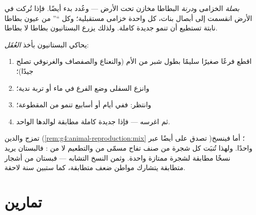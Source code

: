\begin{example}\label{ex:g4:plants-without-seeds:bulbtuber}
\emph{بصلة} الخزامى و\emph{درنة} البطاطا
مخازن تحت الأرض --- وعُدد بدء أيضًا. فإذا تُركت  في الأرض
انقسمت إلى أبصال بنات، كل واحدة خزامى مستقبلية؛ وكل ``'' من
عيون بطاطا نابتة تستطيع أن تنمو  جديدة كاملة. ولذلك يزرع
البستانيون بطاطا لا  بطاطا.
\end{example}

\begin{method}\label{met:g4:plants-without-seeds:cutting}
يحاكي البستانيون  بأخذ
\emph{العُقَل}:
\begin{enumerate}
  \item اقطع فرعًا صغيرًا سليمًا بطول شبر من  الأم (والنعناع
        والصفصاف والغرنوقي تصلح جيدًا)؛
  \item وانزع  السفلى وضع الفرع في ماء أو تربة ندية؛
  \item وانتظر: ففي أيام أو أسابيع تنمو  من  المقطوعة؛
  \item ثم اغرسه --- فإذا  جديدة كاملة مطابقة لوالدها
        الواحد.
\end{enumerate}
\end{method}

\begin{remark}\label{rem:g4:plants-without-seeds:copy}
 تمزج والدين
(\cref{rem:g4:animal-reproduction:mix} تصدق على  أيضًا
عبر )؛ أما  فينسخ واحدًا. ولهذا تُنبَت كل
شجرة من صنف تفاح مسمّى من  والتطعيم لا من : فالبستان
يريد نسخًا مطابقة لشجرة ممتازة واحدة. وثمن النسخ التشابه ---
فبستان من أشجار متطابقة يتشارك مواطن ضعف متطابقة، كما ستبين سنة
لاحقة.
\end{remark}

\section{تمارين}

